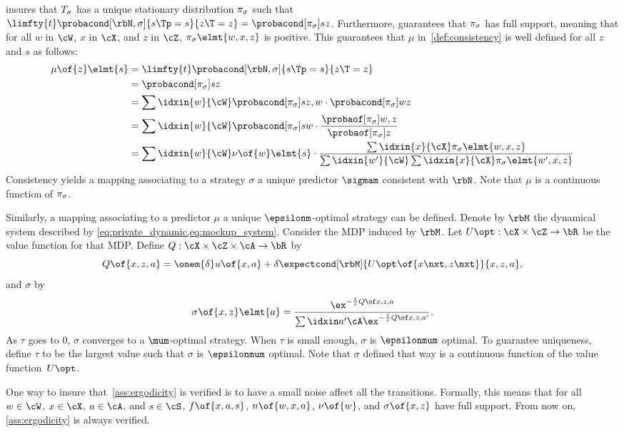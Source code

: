  insures that \(T_{\sigma}\) has a unique stationary distribution \(\pi_{\sigma}\) such that \(\limfty{t}\probacond[\rbN, \sigma]{s\Tp = s}{z\T = z} = \probacond[\pi\strat{\sigma}]{s}{z}\).
Furthermore,  guarantees that \(\pi_{\sigma}\) has full support, meaning that for all \(w\) in \(\cW\), \(x\) in \(\cX\), and \(z\) in \(\cZ\), \(\pi\strat{\sigma}\elmt{w,x,z}\) is positive.
This guarantees that \(\mu\) in~\cref{def:consistency} is well defined for all \(z\) and \(s\) as follows:
\begin{align*}
\mu \of{z} \elmt{s}
&= \limfty{t}\probacond[\rbN, \sigma]{s\Tp = s}{z\T = z} \\
&= \probacond[\pi\strat{\sigma}]{s}{z} \\
&= \sum\idxin{w}{\cW} \probacond[\pi\strat{\sigma}]{s}{z, w} \cdot \probacond[\pi\strat{\sigma}]{w}{z} \\
&= \sum\idxin{w}{\cW} \probacond[\pi\strat{\sigma}]{s}{w} \cdot \frac{\probaof[\pi\strat{\sigma}]{w, z}}{\probaof[\pi\strat{\sigma}]{z}} \\
&= \sum\idxin{w}{\cW} \nu\of{w}\elmt{s} \cdot \frac{\sum\idxin{x}{\cX} \pi\strat{\sigma}\elmt{w,x,z}}{\sum\idxin{w'}{\cW}\sum\idxin{x}{\cX} \pi\strat{\sigma}\elmt{w',x,z}}
\end{align*}
Consistency yields a mapping associating to a strategy \(\sigma\) a unique predictor \(\sigmam\) consistent with \(\rbN\).
Note that \(\mu\) is a continuous function of \(\pi_{\sigma}\).

Similarly, a mapping associating to a predictor \(\mu\) a unique \(\epsilonm\)-optimal strategy can be defined.
Denote by \(\rbM\) the dynamical system described by \cref{eq:private_dynamic,eq:mockup_system}.
Consider the MDP induced by \(\rbM\).
Let \(\Uopt : \cX \times \cZ \to \bR\) be the value function for that MDP.
Define \(Q : \cX \times \cZ \times \cA \to \bR\) by
\[
Q \of{x, z, a} = \onem{\delta} u \of{x, a} + \delta \expectcond[\rbM]{\Uopt \of{x\nxt, z\nxt}}{x, z, a},
\]
and \(\sigma\) by
\[
\sigma \of{x, z} \elmt{a} = \gibbsQ.
\]
As \(\tau\) goes to \(0\), \(\sigma\) converges to a \(\mum\)-optimal strategy.
When \(\tau\) is small enough, \(\sigma\) is \(\epsilonmum\) optimal.
To guarantee uniqueness, define \(\tau\) to be the largest value such that \(\sigma\) is \(\epsilonmum\) optimal.
Note that \(\sigma\) defined that way is a continuous function of the value function~\(\Uopt\).

One way to insure that~\cref{ass:ergodicity} is verified is to have a small noise affect all the transitions.
Formally, this means that for all \(w \in \cW\), \(x \in \cX\), \(a \in \cA\), and \(s \in \cS\), \(f \of{x, a, s}\), \(n \of{w, x, a}\), \(\nu \of{w}\), and \(\sigma \of{x, z}\) have full support.
From now on, \cref{ass:ergodicity} is always verified.

